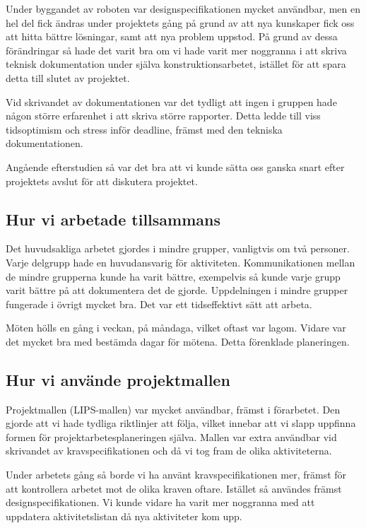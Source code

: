 \documentclass[a4paper,12pt]{article}
\begin{document}
Under byggandet av roboten var designspecifikationen mycket användbar, men en hel del fick ändras under projektets gång på grund av
att nya kunskaper fick oss att hitta bättre lösningar, samt att nya problem uppstod. På grund av dessa förändringar så hade det varit bra om vi
hade varit mer noggranna i att skriva teknisk dokumentation under själva konstruktionsarbetet, istället för att spara detta till slutet av projektet. 

Vid skrivandet av dokumentationen var det tydligt att ingen i gruppen hade någon större erfarenhet i att skriva större rapporter. Detta ledde till
viss tidsoptimism och stress inför deadline, främst med den tekniska dokumentationen. 

Angående efterstudien så var det bra att vi kunde sätta oss ganska snart efter projektets avslut för att diskutera projektet. 

\subsection{Hur vi arbetade tillsammans}
Det huvudsakliga arbetet gjordes i mindre grupper, vanligtvis om två personer. Varje delgrupp hade en huvudansvarig för aktiviteten. 
Kommunikationen mellan de mindre grupperna kunde ha varit bättre, exempelvis så kunde varje grupp varit bättre på att dokumentera
det de gjorde. Uppdelningen i mindre grupper fungerade i övrigt mycket bra. Det var ett tidseffektivt sätt att arbeta. 

Möten hölls en gång i veckan, på måndaga, vilket oftast var lagom. Vidare var det mycket bra med bestämda dagar för mötena. Detta förenklade planeringen. 

\subsection{Hur vi använde projektmallen}
Projektmallen (LIPS-mallen) var mycket användbar, främst i förarbetet. Den gjorde att vi hade tydliga riktlinjer att följa, vilket innebar att vi 
slapp uppfinna formen för projektarbetesplaneringen själva. Mallen var extra användbar vid skrivandet av kravspecifikationen och då vi tog fram 
de olika aktiviteterna. 

Under arbetets gång så borde vi ha använt kravspecifikationen mer, främst för att kontrollera arbetet mot de olika kraven oftare. Istället så
användes främst designspecifikationen. Vi kunde vidare ha varit mer noggranna med att uppdatera aktivitetslistan då nya aktiviteter kom upp. 
\end{document}

